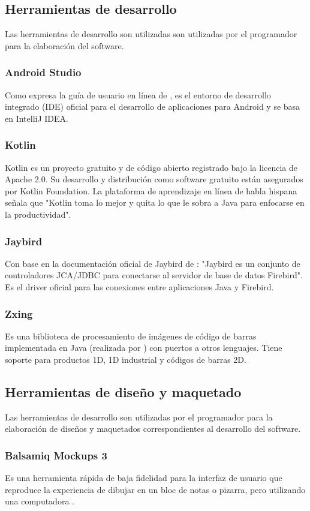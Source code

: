 	\subsection{Herramientas de desarrollo}
	Las herramientas de desarrollo son utilizadas son utilizadas por el programador para la elaboración del software.
	\subsubsection{Android Studio}
	Como expresa la guía de usuario en línea de \textcite{Android}, es el entorno de desarrollo integrado (IDE) oficial para el desarrollo de aplicaciones para Android y se basa en IntelliJ IDEA.
	\subsubsection{Kotlin}
	Kotlin es un proyecto gratuito y de código abierto registrado bajo la licencia de Apache 2.0. Su desarrollo y distribución como software gratuito están asegurados por Kotlin Foundation. La plataforma de aprendizaje en línea de habla hispana \textcite{Platzi} señala que "Kotlin toma lo mejor y quita lo que le sobra a Java para enfocarse en la productividad".
	\subsubsection{Jaybird}
	Con base en la documentación oficial de Jaybird de \textcite{Jaybird}: "Jaybird es un conjunto de controladores JCA/JDBC para conectarse al servidor de base de datos Firebird". Es el driver oficial para las conexiones entre aplicaciones Java y Firebird.
	\subsubsection{Zxing}
	Es una biblioteca de procesamiento de imágenes de código de barras implementada en Java (realizada por \citeauthor{Zxing}) con puertos a otros lenguajes. Tiene soporte para productos 1D, 1D industrial y códigos de barras 2D.
	\subsection{Herramientas de diseño y maquetado}
	Las herramientas de desarrollo son utilizadas por el programador para la elaboración de diseños y maquetados correspondientes al desarrollo del software.
	\subsubsection{Balsamiq Mockups 3}
	Es una herramienta rápida de baja fidelidad para la interfaz de usuario que reproduce la experiencia de dibujar en un bloc de notas o pizarra, pero utilizando una computadora \parencite{Basamiq}.
